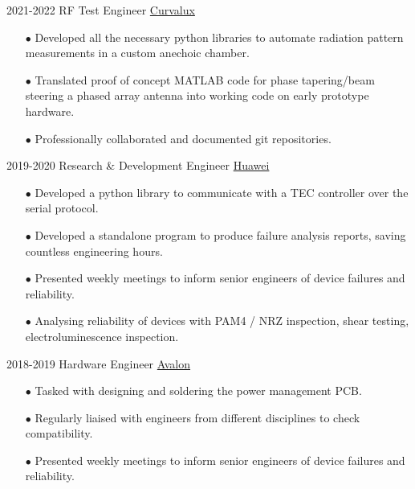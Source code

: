 \documentclass[9pt]{developercv} %
\begin{document}
\begin{entrylist}
	\entry
		{2021-2022}
		{RF Test Engineer}
		{\href{https://Curvalux.com}{Curvalux}}
		{	
			\begin{itemize}
				\item[$\bullet$\hspace*{0.5cm}] Developed all the necessary python libraries to automate radiation pattern measurements in a custom anechoic chamber.
				\item[$\bullet$\hspace*{0.5cm}] Translated proof of concept MATLAB code for phase tapering/beam steering a phased array antenna into working code on early prototype hardware.
				\item[$\bullet$\hspace*{0.5cm}] Professionally collaborated and documented git repositories.
			\end{itemize}
		}
	\entry
		{2019-2020}
		{Research \& Development Engineer}
		{\href{https://www.huawei.com/uk/contact-us}{Huawei}}
		{
			\begin{itemize}
				\item[$\bullet$\hspace*{0.5cm}] Developed a python library to communicate with a TEC controller over the serial protocol.
				\item[$\bullet$\hspace*{0.5cm}] Developed a standalone program to produce failure analysis reports, saving countless engineering hours.
				\item[$\bullet$\hspace*{0.5cm}] Presented weekly meetings to inform senior engineers of device failures and reliability.
				\item[$\bullet$\hspace*{0.5cm}] Analysing reliability of devices with PAM4 / NRZ inspection, shear testing, electroluminescence inspection.
			\end{itemize}
		}
		\entry
		{2018-2019}
		{Hardware Engineer}
		{\href{https://avalonrov.wixsite.com/avalonrov}{Avalon}}
		{
			\begin{itemize}
				\item[$\bullet$\hspace*{0.5cm}] Tasked with designing and soldering the power management PCB.
				\item[$\bullet$\hspace*{0.5cm}] Regularly liaised with engineers from different disciplines to check compatibility.
				\item[$\bullet$\hspace*{0.5cm}] Presented weekly meetings to inform senior engineers of device failures and reliability.

\end{itemize}}
\end{entrylist}
\end{document}
